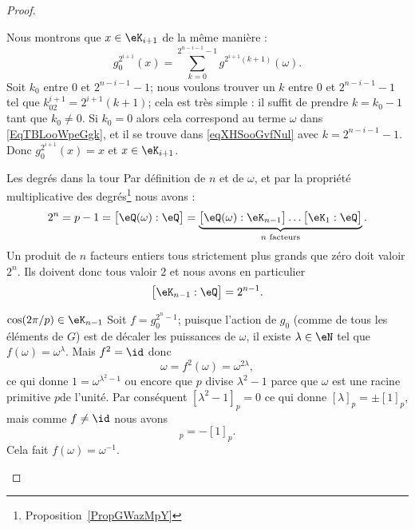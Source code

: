 \begin{proof}
\begin{subproof}
\begin{subproof}
			Nous montrons que \( x\in \eK_{i+1}\) de la même manière :
			\begin{equation}    \label{eqXHSooGvfNul}
				g_0^{2^{i+1}}(x)=\sum_{k=0}^{2^{n-i-1}-1}g^{2^{i+1}(k+1)}(\omega).
			\end{equation}
			Soit \( k_0\) entre \( 0\) et \( 2^{n-i-1}-1\); nous voulons trouver un \( k\) entre \( 0\) et \( 2^{n-i-1}-1\) tel que \( k_02^{i+1}=2^{i+1}(k+1)\); cela est très simple : il suffit de prendre \( k=k_0-1\) tant que \( k_0\neq 0\). Si \( k_0=0\) alors cela correspond au terme \( \omega\) dans \eqref{EqTBLooWpeGgk}, et il se trouve dans \eqref{eqXHSooGvfNul} avec \( k=2^{n-i-1}-1\). Donc \( g_0^{2^{i+1}}(x)=x\) et \( x\in \eK_{i+1}\).
			\item[Les degrés dans la tour]
			Par définition de \( n\) et de \( \omega\), et par la propriété multiplicative des degrés\footnote{Proposition~\ref{PropGWazMpY}} nous avons :
			\begin{equation}
				2^n=p-1=\big[ \eQ(\omega):\eQ \big]=\underbrace{\big[ \eQ(\omega):\eK_{n-1} \big]\ldots\big[ \eK_1:\eQ \big]}_{ n\text{ facteurs}}.
			\end{equation}
			Un produit de \( n\) facteurs entiers tous strictement plus grands que zéro doit valoir \( 2^n\). Ils doivent donc tous valoir \( 2\) et nous avons en particulier
			\begin{equation}
				\big[ \eK_{n-1}:\eQ \big]=2^{n-1}.
			\end{equation}
			\item[\( \cos(2\pi/p)\in \eK_{n-1}\)]
			Soit \( f=g_0^{2^n-1}\); puisque l'action de \( g_0\) (comme de tous les éléments de \( G\)) est de décaler les puissances de \( \omega\), il existe \( \lambda\in \eN\) tel que \( f(\omega)=\omega^{\lambda}\). Mais \( f^2=\id\) donc
			\begin{equation}
				\omega=f^2(\omega)=\omega^{2\lambda},
			\end{equation}
			ce qui donne \( 1=\omega^{\lambda^2-1}\) ou encore que \( p\) divise \( \lambda^2-1\) parce que \( \omega\) est une racine primitive \( p\)\ieme de l'unité. Par conséquent \( [\lambda^2-1]_p=0\) ce qui donne \( [\lambda]_p=\pm[1]_p\), mais comme \( f\neq \id\) nous avons
			\begin{equation}
				[\lambda]_p=-[1]_p.
			\end{equation}
			Cela fait \( f(\omega)=\omega^{-1}\).


\end{subproof}
\end{subproof}
\end{proof}
